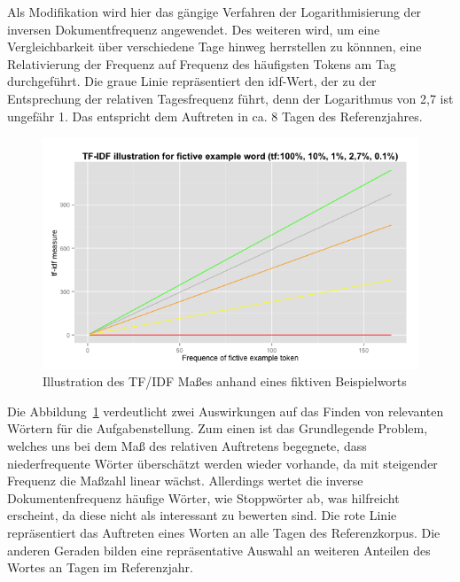 Als Modifikation wird hier das gängige Verfahren der Logarithmisierung der inversen Dokumentfrequenz angewendet. Des weiteren wird, um eine Vergleichbarkeit über verschiedene Tage hinweg herrstellen zu könnnen, eine Relativierung der Frequenz auf Frequenz des häufigsten Tokens am Tag durchgeführt. Die graue Linie repräsentiert den idf-Wert, der zu der Entsprechung der relativen Tagesfrequenz führt, denn der Logarithmus von 2,7 ist ungefähr 1. Das entspricht dem Auftreten in ca. 8 Tagen des Referenzjahres.\\
\begin{figure}[h!]
    \centering
    \includegraphics[width=1\textwidth]{pictures/tfidfIllustration.png}
    \caption{Illustration des TF/IDF Maßes anhand eines fiktiven Beispielworts}\label{pic.tfid_mass}
\end{figure}
Die Abbildung~\ref{pic.tfid_mass} verdeutlicht zwei Auswirkungen auf das Finden von relevanten Wörtern für die Aufgabenstellung. Zum einen ist das Grundlegende Problem, welches uns bei dem Maß des relativen Auftretens begegnete, dass niederfrequente Wörter überschätzt werden wieder vorhande, da mit steigender Frequenz die Maßzahl linear wächst. Allerdings wertet die inverse Dokumentenfrequenz häufige Wörter, wie Stoppwörter ab, was hilfreicht erscheint, da diese nicht als interessant zu bewerten sind.
Die rote Linie repräsentiert das Auftreten eines Worten an alle Tagen des Referenzkorpus. Die anderen Geraden bilden eine repräsentative Auswahl an weiteren Anteilen des Wortes an Tagen im Referenzjahr.\\

